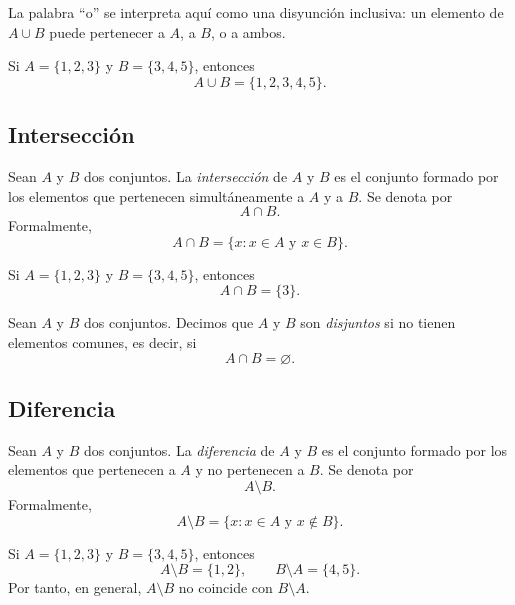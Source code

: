 La palabra ``o'' se interpreta aquí como una disyunción inclusiva: un elemento de \(A\cup B\) puede pertenecer a \(A\), a \(B\), o a ambos.

\begin{ejemplo}
Si \(A=\{1,2,3\}\) y \(B=\{3,4,5\}\), entonces
\[
  A\cup B=\{1,2,3,4,5\}.
\]
\end{ejemplo}

\subsection{Intersección}

\begin{definicion}[Intersección]
Sean \(A\) y \(B\) dos conjuntos. La \emph{intersección} de \(A\) y \(B\) es el conjunto formado por los elementos que pertenecen simultáneamente a \(A\) y a \(B\). Se denota por
\[
  A\cap B.
\]
Formalmente,
\[
  A\cap B = \{x : x\in A \text{ y } x\in B\}.
\]
\end{definicion}

\begin{ejemplo}
Si \(A=\{1,2,3\}\) y \(B=\{3,4,5\}\), entonces
\[
  A\cap B=\{3\}.
\]
\end{ejemplo}

\begin{definicion}
Sean \(A\) y \(B\) dos conjuntos. Decimos que \(A\) y \(B\) son \emph{disjuntos} si no tienen elementos comunes, es decir, si
\[
  A\cap B=\varnothing.
\]
\end{definicion}

\subsection{Diferencia}

\begin{definicion}
Sean \(A\) y \(B\) dos conjuntos. La \emph{diferencia} de \(A\) y \(B\) es el conjunto formado por los elementos que pertenecen a \(A\) y no pertenecen a \(B\). Se denota por
\[
  A\setminus B.
\]
Formalmente,
\[
  A\setminus B = \{x : x\in A \text{ y } x\notin B\}.
\]
\end{definicion}

\begin{ejemplo}
Si \(A=\{1,2,3\}\) y \(B=\{3,4,5\}\), entonces
\[
  A\setminus B=\{1,2\},
  \qquad
  B\setminus A=\{4,5\}.
\]
Por tanto, en general, \(A\setminus B\) no coincide con \(B\setminus A\).
\end{ejemplo}

